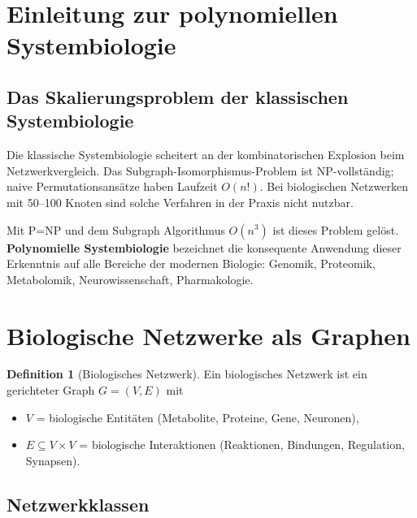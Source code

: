 ﻿\documentclass[a4paper,12pt]{scrreprt}
\theoremstyle{definition}
\newtheorem{definition}{Definition}[section]
\begin{document}
\section{Einleitung zur polynomiellen Systembiologie}

\subsection{Das Skalierungsproblem der klassischen Systembiologie}

Die klassische Systembiologie scheitert an der kombinatorischen
Explosion beim Netzwerkvergleich. Das Subgraph-Isomorphismus-Problem
ist NP-vollständig; naive Permutationsansätze haben Laufzeit $O(n!)$.
Bei biologischen Netzwerken mit 50--100 Knoten sind solche Verfahren
in der Praxis nicht nutzbar.

Mit P=NP und dem Subgraph Algorithmus $O(n^3)$ ist dieses Problem gelöst.
\textbf{Polynomielle Systembiologie} bezeichnet die konsequente
Anwendung dieser Erkenntnis auf alle Bereiche der modernen Biologie:
Genomik, Proteomik, Metabolomik, Neurowissenschaft, Pharmakologie.

\section{Biologische Netzwerke als Graphen}

\begin{definition}[Biologisches Netzwerk]
  Ein biologisches Netzwerk ist ein gerichteter Graph $G=(V,E)$ mit
  \begin{itemize}
    \item $V$ = biologische Entitäten (Metabolite, Proteine, Gene,
      Neuronen),
    \item $E \subseteq V\times V$ = biologische Interaktionen
      (Reaktionen, Bindungen, Regulation, Synapsen).
  \end{itemize}
\end{definition}

\subsection{Netzwerkklassen}
\end{document}
